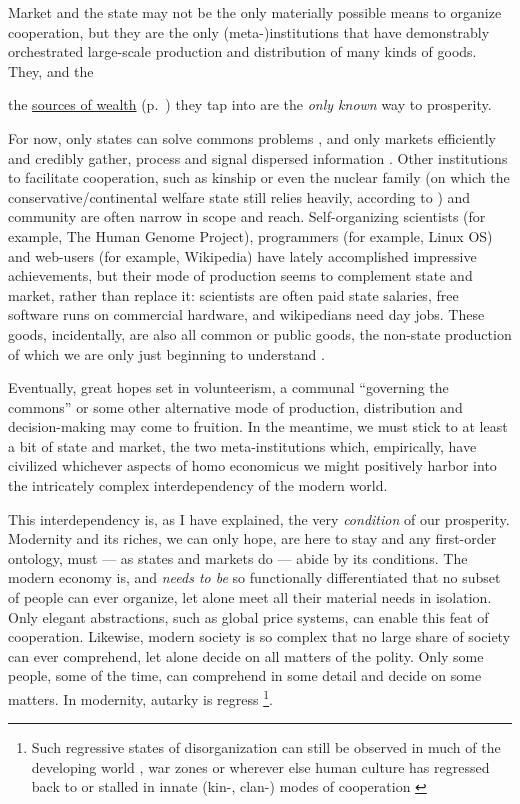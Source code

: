 Market and the state may not be the only materially possible means to organize cooperation, but they are the only (meta-)institutions that have demonstrably orchestrated large-scale production and distribution of many kinds of goods. 
They, and the {the \hyperref[sec:sources-of-wealth]{sources of wealth} (p.~\pageref{sec:sources-of-wealth}) they tap into are the \emph{only known} way to prosperity. 

For now, only states can solve commons problems \citep[for example,]{Hardin-1968-aa}, and only markets efficiently and credibly gather, process and signal dispersed information \citep{Hayek1931}. 
Other institutions to facilitate cooperation, such as kinship \citep{Van-den-Berghe-1981-aa,Hammond2006} or even the nuclear family (on which the conservative/continental welfare state still relies heavily, according to \citealt{Esping-Andersen-1990-aa}) and community \citep{Ostrom1990} are often narrow in scope and reach. 
Self-organizing scientists (for example, The Human Genome Project), programmers (for example, Linux OS) and web-users (for example, Wikipedia) have lately accomplished impressive achievements, but their mode of production seems to complement state and market, rather than replace it: scientists are often paid state salaries, free software runs on commercial hardware, and wikipedians need day jobs. 
These goods, incidentally, are also all common or public goods, the non-state production of which we are only just beginning to understand \citep{Ostrom1990}. 

Eventually, great hopes set in volunteerism, a communal ``governing the commons'' \citep{Ostrom1990} or some other alternative mode of production, distribution and decision-making may come to fruition. 
In the meantime, we must stick to at least a bit of state and market, the two meta-institutions which, empirically, have civilized whichever aspects of homo economicus we might positively harbor into the intricately complex interdependency of the modern world.

This interdependency is, as I have explained, the very \emph{condition} of our prosperity. Modernity and its riches, we can only hope, are here to stay \citep{Diamond-2005-aa} and any first-order ontology, must --- as states and markets do --- abide by its conditions. 
The modern economy is, and \emph{needs to be} so functionally differentiated that no subset of people can ever organize, let alone meet all their material needs in isolation. 
Only elegant abstractions, such as global price systems, can enable this feat of cooperation. 
Likewise, modern society is so complex that no large share of society can ever comprehend, let alone decide on all matters of the polity. 
Only some people, some of the time, can comprehend in some detail and decide on some matters. 
In modernity, autarky is regress
\footnote{
	Such regressive states of disorganization can still be observed in much of the developing world \citep[confer][]{Clark2007,Easterly-2006-aa}, war zones \citep[on the Iraq example,][]{Baker-IIIHamilton-2006-aa} or wherever else human culture has regressed back to or stalled in innate (kin-, clan-) modes of cooperation \citep[on the southern italian example,][]{PutnamLeonardi-1993-aa}
}.

}
